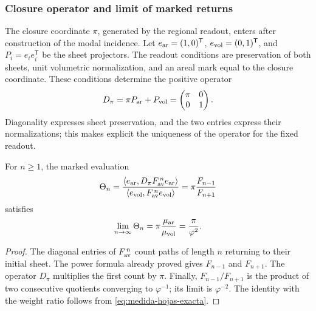 \subsubsection{Closure operator and limit of marked returns}
\label{sec:operador-retorno-marcado}

The closure coordinate \(\pi\), generated by the regional readout,
enters after construction of the modal incidence. Let
\(e_{\rm ar}=(1,0)^{\mathsf T}\),
\(e_{\rm vol}=(0,1)^{\mathsf T}\), and
\(P_i=e_ie_i^{\mathsf T}\) be the sheet projectors. The readout
conditions are preservation of both sheets, unit volumetric normalization,
and an areal mark equal to the closure coordinate. These conditions
determine the positive operator
\begin{equation}
 D_\pi=\pi P_{\rm ar}+P_{\rm vol}
       =\begin{pmatrix}\pi&0\\0&1\end{pmatrix}.
 \label{eq:operador-marca-pi}
\end{equation}
Diagonality expresses sheet preservation, and the two entries
express their normalizations; this makes explicit the uniqueness
of the operator for the fixed readout.

\begin{proposition}
For \(n\geq1\), the marked evaluation
\begin{equation}
 \Theta_n=
 \frac{\langle e_{\rm ar},D_\pi F_{\rm av}^{\,n}e_{\rm ar}\rangle}
 {\langle e_{\rm vol},F_{\rm av}^{\,n}e_{\rm vol}\rangle}
 =\pi\frac{F_{n-1}}{F_{n+1}}
 \label{eq:retorno-marcado-finito}
\end{equation}
satisfies
\begin{equation}
 \lim_{n\to\infty}\Theta_n
 =\pi\frac{\mu_{\rm ar}}{\mu_{\rm vol}}
 =\frac{\pi}{\varphi^2}.
 \label{eq:retorno-marcado-limite}
\end{equation}
\end{proposition}
\begin{proof}
The diagonal entries of \(F_{\rm av}^{\,n}\) count paths
of length \(n\) returning to their initial sheet. The power formula
already proved gives \(F_{n-1}\) and \(F_{n+1}\). The operator
\(D_\pi\) multiplies the first count by \(\pi\). Finally,
\(F_{n-1}/F_{n+1}\) is the product of two consecutive quotients
converging to \(\varphi^{-1}\); its limit is
\(\varphi^{-2}\). The identity with the weight ratio follows from
\eqref{eq:medida-hojas-exacta}.
\end{proof}

